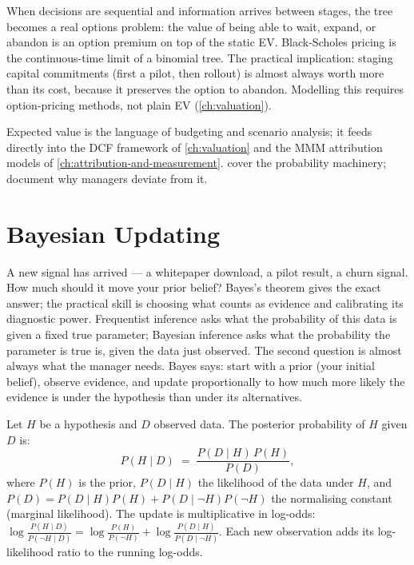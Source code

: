 When decisions are sequential and information arrives between stages, the tree becomes a real
options problem: the value of being able to wait, expand, or abandon is an option premium on top
of the static EV. Black-Scholes pricing is the continuous-time limit of a binomial tree. The
practical implication: staging capital commitments (first a pilot, then rollout) is almost always
worth more than its cost, because it preserves the option to abandon. Modelling this requires
option-pricing methods, not plain EV (\cref{ch:valuation}).

Expected value is the language of budgeting and scenario analysis; it feeds directly into the
DCF framework of \cref{ch:valuation} and the MMM attribution models of
\cref{ch:attribution-and-measurement}. \textcite{anderson2019statistics} cover the probability
machinery; \textcite{kahneman2011} document why managers deviate from it.

\section{Bayesian Updating}\label{sec:bayesian-updating}

A new signal has arrived --- a whitepaper download, a pilot result, a churn signal. How much
should it move your prior belief? Bayes's theorem gives the exact answer; the practical skill is
choosing what counts as evidence and calibrating its diagnostic power. Frequentist inference asks
what the probability of this data is given a fixed true parameter; Bayesian inference asks what
the probability the parameter is true is, given the data just observed. The second question is
almost always what the manager needs. Bayes says: start with a prior (your initial belief),
observe evidence, and update proportionally to how much more likely the evidence is under the
hypothesis than under its alternatives.

Let \(H\) be a hypothesis and \(D\) observed data. The posterior probability of \(H\) given \(D\) is:
\begin{equation}\label{eq:bayes}
  P(H \mid D) \;=\; \frac{P(D \mid H)\,P(H)}{P(D)},
\end{equation}
where \(P(H)\) is the prior, \(P(D \mid H)\) the likelihood of the data under \(H\), and
\(P(D)=P(D\mid H)P(H)+P(D\mid \neg H)P(\neg H)\) the normalising constant (marginal likelihood).
The update is multiplicative in log-odds: \(\log\frac{P(H\mid D)}{P(\neg H\mid D)} =
\log\frac{P(H)}{P(\neg H)} + \log\frac{P(D\mid H)}{P(D\mid \neg H)}\). Each new observation
adds its log-likelihood ratio to the running log-odds.

